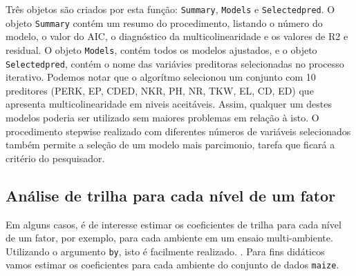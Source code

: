 \documentclass[
]{book}
\newenvironment{Shaded}{\begin{snugshade}}{\end{snugshade}}
\newcommand{\CommentTok}[1]{\textcolor[rgb]{0.56,0.35,0.01}{\textit{#1}}}
\newcommand{\DataTypeTok}[1]{\textcolor[rgb]{0.13,0.29,0.53}{#1}}
\newcommand{\KeywordTok}[1]{\textcolor[rgb]{0.13,0.29,0.53}{\textbf{#1}}}
\newcommand{\NormalTok}[1]{#1}
\newcommand{\OperatorTok}[1]{\textcolor[rgb]{0.81,0.36,0.00}{\textbf{#1}}}
\newcommand{\StringTok}[1]{\textcolor[rgb]{0.31,0.60,0.02}{#1}}
\begin{document}
Três objetos são criados por esta função: \texttt{Summary}, \texttt{Models} e \texttt{Selectedpred}. O objeto \texttt{Summary} contém um resumo do procedimento, listando o número do modelo, o valor do AIC, o diagnóstico da multicolinearidade  e os valores de R2 e residual. O objeto \texttt{Models}, contém todos os modelos ajustados, e o objeto \texttt{Selectedpred}, contém o nome das variávies preditoras selecionadas no processo iterativo. Podemos notar que o algorítmo selecionou um conjunto com 10 preditores (PERK, EP, CDED, NKR, PH, NR, TKW, EL, CD, ED) que apresenta multicolinearidade em niveis aceitáveis. Assim, qualquer um destes modelos poderia ser utilizado sem maiores problemas em relação à isto. O procedimento stepwise realizado com diferentes números de variáveis selecionados também permite a seleção de um modelo mais parcimonio, tarefa que ficará a critério do pesquisador.

\hypertarget{anuxe1lise-de-trilha-para-cada-nuxedvel-de-um-fator}{%
\subsection{Análise de trilha para cada nível de um fator}\label{anuxe1lise-de-trilha-para-cada-nuxedvel-de-um-fator}}

Em alguns casos, é de interesse estimar os coeficientes de trilha para cada nível de um fator, por exemplo, para cada ambiente em um ensaio multi-ambiente. Utilizando o argumento \texttt{by}, isto é facilmente realizado. . Para fins didáticos vamos estimar os coeficientes para cada ambiente do conjunto de dados \texttt{maize}.

 

\begin{Shaded}
\end{Shaded}
\end{document}
